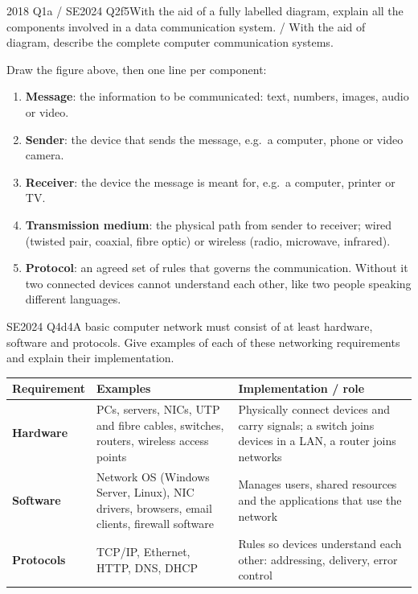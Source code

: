 \documentclass[10pt]{article}
\begin{document}
\begin{pastq}{2018 Q1a \textnormal{/} SE2024 Q2f}{5}With the aid of a fully labelled diagram, explain all the components involved in a data communication system. / With the aid of diagram, describe the complete computer communication systems.\end{pastq}
\begin{ans}
Draw the figure above, then one line per component:
\begin{enumerate}
\item \textbf{Message}: the information to be communicated: text, numbers, images, audio or video.
\item \textbf{Sender}: the device that sends the message, e.g.\ a computer, phone or video camera.
\item \textbf{Receiver}: the device the message is meant for, e.g.\ a computer, printer or TV.
\item \textbf{Transmission medium}: the physical path from sender to receiver; wired (twisted pair, coaxial, fibre optic) or wireless (radio, microwave, infrared).
\item \textbf{Protocol}: an agreed set of rules that governs the communication. Without it two connected devices cannot understand each other, like two people speaking different languages.
\end{enumerate}
\end{ans}

\begin{pastq}{SE2024 Q4d}{4}A basic computer network must consist of at least hardware, software and protocols. Give examples of each of these networking requirements and explain their implementation.\end{pastq}
\begin{ans}
\small
\begin{tabularx}{\linewidth}{@{}>{\bfseries}lXX@{}}
\toprule
Requirement & Examples & Implementation / role\\\midrule
Hardware & PCs, servers, NICs, UTP and fibre cables, switches, routers, wireless access points & Physically connect devices and carry signals; a switch joins devices in a LAN, a router joins networks\\
Software & Network OS (Windows Server, Linux), NIC drivers, browsers, email clients, firewall software & Manages users, shared resources and the applications that use the network\\
Protocols & TCP/IP, Ethernet, HTTP, DNS, DHCP & Rules so devices understand each other: addressing, delivery, error control\\
\bottomrule
\end{tabularx}
\end{ans}
\end{document}
